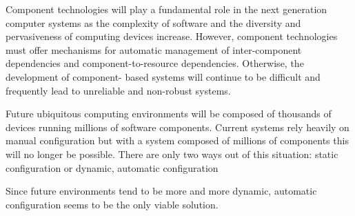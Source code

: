 Component technologies will play a fundamental role in the next generation
computer systems as the complexity of software and the diversity and
pervasiveness of computing devices increase. However, component technologies
must offer mechanisms for automatic management of inter-component dependencies
and component-to-resource dependencies. Otherwise, the development of
component- based systems will continue to be difficult and frequently lead to
unreliable and non-robust systems.  

Future ubiquitous computing environments will be composed of thousands of
devices running millions of software components. Current systems rely heavily
on manual configuration but with a system composed of millions of components
this will no longer be possible.  There are only two ways out of this
situation: static configuration or dynamic, automatic configuration

Since future environments tend to be more and more dynamic, automatic
configuration seems to be the only viable solution.

